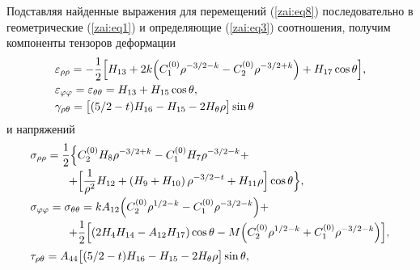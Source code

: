 Подставляя найденные выражения для перемещений (\ref{zai:eq8})
последовательно в геометрические (\ref{zai:eq1}) и определяющие
(\ref{zai:eq3}) соотношения, получим компоненты тензоров деформации
\begin{equation}
\label{zai:eq9} 
\begin{array}{l}
\displaystyle
\varepsilon _{\rho \rho } = - \frac{1}{2}\Bigl[ H_{13} + 2k\Bigl( C_1^{(0)} \rho ^{ - 3 \mathord{\left/
{\vphantom {3 2}} \right. \kern-\nulldelimiterspace} 2 - k} -
C_2^{(0)} \rho ^{ - 3 \mathord{\left/ {\vphantom {3 2}}
\right. \kern-\nulldelimiterspace} 2 + k} \Bigr) + H_{17} \cos \theta  \Bigr], \vspace{1mm} \\
\displaystyle
\varepsilon _{\varphi \varphi } = \varepsilon _{\theta \theta } = H_{13} + H_{15}
\cos \theta  , \vspace{1mm}
\\
\gamma _{\rho \theta } = \bigl[ ( {5}/{2} - t )H_{16} - H_{15} - 2H_\theta \rho  \bigr]\sin \theta
\end{array}
\end{equation}
\noindent и напряжений
\begin{equation}
 \label{zai:eq10}
 \begin{array}{l}
 \displaystyle
 \sigma _{\rho \rho } = \frac{1}{2}\Bigl\{ C_2^{(0)} H_8 \rho
^{ - 3 \mathord{\left/ {\vphantom {3 2}} \right.
\kern-\nulldelimiterspace} 2 + k} - C_1^{(0)} H_7 \rho
^{ - 3 \mathord{\left/ {\vphantom
{3 2}} \right. \kern-\nulldelimiterspace} 2 - k} +  \vspace{1mm} \\
\displaystyle \hspace{1.2cm}
 + \Bigl[ \frac{1}{\rho^2} H_{12}  + \left( {H_9 + H_{10} } \right)\rho
^{{ - 3} \mathord{\left/ {\vphantom {{ - 3} 2}} \right.
\kern-\nulldelimiterspace} 2 - t} + H_{11} \rho \Bigr]\cos \theta
 \Bigr\} , \vspace{1mm}
\\
\displaystyle 
 \sigma _{\varphi \varphi } = \sigma _{\theta \theta } = kA_{12} \Bigl(
{C_2^{(0)} \rho ^{1 \mathord{\left/ {\vphantom {1 2}}
\right. \kern-\nulldelimiterspace} 2 - k} - C_1^{(0)}
\rho ^{ - 3 \mathord{\left/ {\vphantom {3 2}} \right.
\kern-\nulldelimiterspace} 2 - k}}
\Bigr) + \vspace{1mm}
\\
\displaystyle  \hspace{1.2cm}
 + \frac{1}{2}\Bigl[ ( 2H_4 H_{14} - A_{12} H_{17} )\cos \theta - M\Bigl( C_2^{(0)} \rho ^{1/2-k} +
C_1^{(0)} \rho ^{ - 3/2 - k} \Bigr) \Bigr] , \vspace{2mm}
\\
 \tau _{\rho \theta } = A_{44} \bigl[ (5/2- t)H_{16} - H_{15} - 2H_\theta \rho \bigr]\sin \theta ,
\end{array}
\end{equation}

